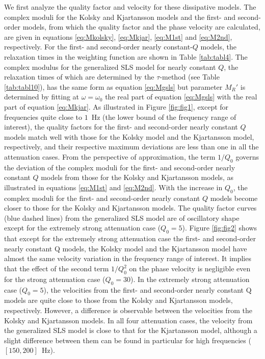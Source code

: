 \documentclass[article]{./macros/elsarticle_qh}
\begin{document}
We first analyze the quality factor and velocity for these dissipative models. 
The complex moduli for the Kolsky and Kjartansson models and the first- and second-order models, from which the quality factor and the phase velocity are calculated, are given in equations \ref{eq:Mkolsky}, \ref{eq:Mkjar}, \ref{eq:M1st} and \ref{eq:M2nd}, respectively. For the first- and second-order nearly constant-$Q$ models, the relaxation times in the weighting function are shown in Table \ref{tab:tabl4}. 
The complex modulus for the generalized SLS model for nearly constant $Q$, the relaxation times of which are determined by the $\tau$-method (see Table \ref{tab:tabl10}), has the same form as equation \ref{eq:Mgsls} but parameter $M_{R}'$ is determined by fitting at $\omega=\omega_{0}$ the real part of equation \ref{eq:Mgsls} with the real part of equation \ref{eq:Mkjar}.   
As illustrated in Figure \ref{fig:fig1}, except for frequencies quite close to $1$~Hz (the lower bound of the frequency range of interest), the quality factors for the first- and second-order nearly constant $Q$ models match well with those for the Kolsky model and the Kjartansson model, respectively, and their respective maximum deviations are less than one in all the attenuation cases. From the perspective of approximation, the term $1/Q_{0}$ governs the deviation of the complex moduli for the first- and second-order nearly constant $Q$ models from those for the Kolsky and Kjartansson models, as illustrated in equations \ref{eq:M1st} and \ref{eq:M2nd}. With the increase in $Q_{0}$, the complex moduli for the first- and second-order nearly constant $Q$ models become closer to those for the Kolsky and Kjartansson models. The quality factor curves (blue dashed lines) from the generalized SLS model are of oscillatory shape except for the extremely strong attenuation case ($Q_{0} = 5$). Figure \ref{fig:fig2} shows that except for the extremely strong attenuation case the first- and second-order nearly constant Q models, the Kolsky model and the Kjartansson model have almost the same velocity variation in the frequency range of interest. It implies that the effect of the second term $1/Q_{0}^2$ on the phase velocity is negligible even for the strong attenuation case ($Q_{0}=30$). In the extremely strong attenuation case ($Q_{0}=5$), the velocities from the first- and second-order nearly constant Q models are quite close to those from the Kolsky and Kjartansson models, respectively. However, a difference is observable between the velocities from the Kolsky and Kjartansson models. In all four attenuation cases, the velocity from the generalized SLS model is close to that for the Kjartansson model, although a slight difference between them can be found in particular for high frequencies ($[150,200]$~Hz).
\end{document}
